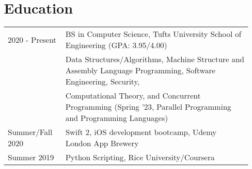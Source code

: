 \documentclass[letter,10pt]{article}
\begin{document}
\section{Education}
\begin{tabularx}{\linewidth}{@{}l X@{}}	
2020 - Present & BS in Computer Science, Tufts University School of Engineering \hfill \normalsize (GPA: 3.95/4.00) \\
    & \footnotesize{Data Structures/Algorithms, Machine Structure and Assembly Language Programming, Software Engineering, Security,} \\
    & \footnotesize{Computational Theory, and Concurrent Programming (Spring '23, Parallel Programming and Programming Languages)} \\[3.75pt]
Summer/Fall 2020 & Swift 2, iOS development bootcamp, Udemy London App Brewery \\[3.75pt]
Summer 2019 & Python Scripting, Rice University/Coursera	
\end{tabularx}



\end{document}
